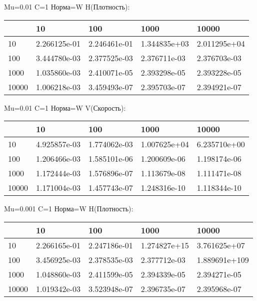 \documentclass[a4paper, 12pt]{article}
\begin{document}
\bigskip
\bigskip
\bigskip


Mu=0.01  C=1 Норма=W H(Плотность):


\begin{tabular}{lllll}
\toprule
{} &         10    &         100   &         1000  &         10000 \\
\midrule
10    &  2.266125e-01 &  2.246461e-01 &  1.344835e+03 &  2.011295e+04 \\
100   &  3.444780e-03 &  2.377525e-03 &  2.376711e-03 &  2.376703e-03 \\
1000  &  1.035860e-03 &  2.410071e-05 &  2.393298e-05 &  2.393228e-05 \\
10000 &  1.006218e-03 &  3.459493e-07 &  2.395703e-07 &  2.394921e-07 \\
\bottomrule
\end{tabular}



\bigskip
\bigskip
\bigskip


Mu=0.01  C=1 Норма=W V(Скорость):


\begin{tabular}{lllll}
\toprule
{} &         10    &         100   &         1000  &         10000 \\
\midrule
10    &  4.925857e-03 &  1.774062e-03 &  1.007625e+04 &  6.235710e+00 \\
100   &  1.206466e-03 &  1.585101e-06 &  1.200609e-06 &  1.198174e-06 \\
1000  &  1.172444e-03 &  1.576896e-07 &  1.113679e-08 &  1.111471e-08 \\
10000 &  1.171004e-03 &  1.457743e-07 &  1.248316e-10 &  1.118344e-10 \\
\bottomrule
\end{tabular}



\bigskip
\bigskip
\bigskip


Mu=0.001  C=1 Норма=W H(Плотность):


\begin{tabular}{lllll}
\toprule
{} &         10    &         100   &         1000  &          10000 \\
\midrule
10    &  2.266165e-01 &  2.247186e-01 &  1.274827e+15 &   3.761625e+07 \\
100   &  3.456925e-03 &  2.378535e-03 &  2.377712e-03 &  1.889691e+109 \\
1000  &  1.048860e-03 &  2.411599e-05 &  2.394339e-05 &   2.394271e-05 \\
10000 &  1.019342e-03 &  3.523948e-07 &  2.396735e-07 &   2.395968e-07 \\
\bottomrule
\end{tabular}
\end{document}
